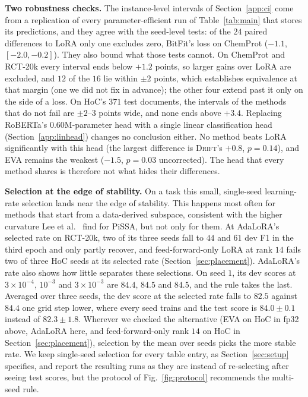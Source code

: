 \documentclass[conference,onecolumn]{IEEEtran}
\newcommand{\method}{\textsc{Drift}}
\begin{document}
\noindent\textbf{Two robustness checks.} The instance-level intervals of
Section~\ref{app:ci} come from a replication of every parameter-efficient run
of Table~\ref{tab:main} that stores its predictions, and they agree with the
seed-level tests: of the $24$ paired differences to LoRA only one excludes zero,
BitFit's loss on ChemProt ($-1.1$, $[-2.0, -0.2]$). They also bound what those
tests cannot. On ChemProt and RCT-20k every interval ends below $+1.2$ points,
so larger gains over LoRA are excluded, and $12$ of the $16$ lie within $\pm2$
points, which establishes equivalence at that margin (one we did not fix in
advance); the other four extend past it only on the side of a loss. On HoC's
$371$ test documents, the intervals of the methods that do not fail are
$\pm2$--$3$ points wide, and none ends above $+3.4$. Replacing RoBERTa's $0.60$M-parameter head with a single linear
classification head (Section~\ref{app:linhead}) changes no conclusion either.
No method beats LoRA significantly with this head (the largest difference is
\method{}'s $+0.8$, $p = 0.14$), and EVA remains the weakest ($-1.5$,
$p = 0.03$ uncorrected). The head that every method shares is
therefore not what hides their differences.

\noindent\textbf{Selection at the edge of stability.} On a task this small,
single-seed learning-rate selection lands near the edge of stability. This
happens most often for methods that start from a data-derived subspace,
consistent with the higher curvature Lee et al.~\cite{lee2026lrmatters} find for
PiSSA, but not only for them. At AdaLoRA's selected rate on RCT-20k, two of its
three seeds fall to $44$ and $61$ dev F1 in the third epoch and only partly
recover, and feed-forward-only LoRA at rank $14$ fails two of three HoC seeds at
its selected rate (Section~\ref{sec:placement}). AdaLoRA's rate also shows how
little separates these selections. On seed $1$, its dev scores at
$3\times10^{-4}$, $10^{-3}$ and $3\times10^{-3}$ are $84.4$, $84.5$ and $84.5$,
and the rule takes the last. Averaged over three seeds, the dev score at the
selected rate falls to $82.5$ against $84.4$ one grid step lower, where every
seed trains and the test score is $84.0\pm0.1$ instead of $82.3\pm1.8$. Wherever
we checked the alternative (EVA on HoC in fp32 above, AdaLoRA here, and
feed-forward-only rank $14$ on HoC in Section~\ref{sec:placement}), selection by
the mean over seeds picks the more stable rate. We keep single-seed selection
for every table entry, as Section~\ref{sec:setup} specifies, and report the
resulting runs as they are instead of re-selecting after seeing test scores, but
the protocol of Fig.~\ref{fig:protocol} recommends the multi-seed rule.
\end{document}
